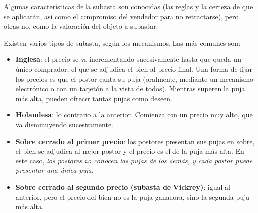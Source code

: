 \documentclass[12pt]{article}
\begin{document}
Algunas características de la subasta son conocidas (las reglas y la certeza de que se aplicarán, asi como el compromiso del vendedor para no retractarse), pero otras no, como la valoración del objeto a subastar.

Existen varios tipos de subasta, según los mecanismos. Las más comunes son:

\begin{itemize}
	\item \textbf{Inglesa}: el precio se va incrementando sucesivamente hasta que queda un único comprador, el que se adjudica el bien al precio final. Una forma de fijar los precios es que el postor canta su puja (oralmente, mediante un mecanismo electrónico o con un tarjetón a la vista de todos). Mientras superen la puja más alta, pueden ofrecer tantas pujas como deseen.

	\item \textbf{Holandesa}: lo contrario a la anterior. Comienza con un precio muy alto, que va disminuyendo sucesivamente.

	\item \textbf{Sobre cerrado al primer precio}: los postores presentan sus pujas en sobre, el bien se adjudica al mejor postor y el precio es el de la puja más alta. En este caso, \textit{los postores no conocen las pujas de los demás, y cada postor puede presentar una única puja. }

	\item \textbf{Sobre cerrado al segundo precio (subasta de Vickrey)}: igual al anterior, pero el precio del bien no es la puja ganadora, sino la segunda puja más alta.
\end{itemize}
\end{document}
